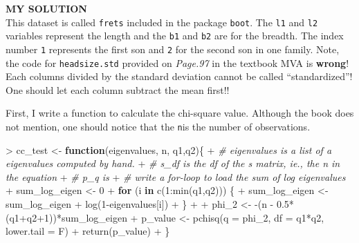 \documentclass[
]{article}
\newenvironment{Shaded}{\begin{snugshade}}{\end{snugshade}}
\newcommand{\AttributeTok}[1]{\textcolor[rgb]{0.77,0.63,0.00}{#1}}
\newcommand{\CommentTok}[1]{\textcolor[rgb]{0.56,0.35,0.01}{\textit{#1}}}
\newcommand{\ControlFlowTok}[1]{\textcolor[rgb]{0.13,0.29,0.53}{\textbf{#1}}}
\newcommand{\DecValTok}[1]{\textcolor[rgb]{0.00,0.00,0.81}{#1}}
\newcommand{\FloatTok}[1]{\textcolor[rgb]{0.00,0.00,0.81}{#1}}
\newcommand{\FunctionTok}[1]{\textcolor[rgb]{0.00,0.00,0.00}{#1}}
\newcommand{\NormalTok}[1]{#1}
\newcommand{\OtherTok}[1]{\textcolor[rgb]{0.56,0.35,0.01}{#1}}
\newcommand{\SpecialCharTok}[1]{\textcolor[rgb]{0.00,0.00,0.00}{#1}}
\begin{document}
\textbf{MY SOLUTION}\\
This dataset is called \texttt{frets} included in the package
\texttt{boot}. The \texttt{l1} and \texttt{l2} variables represent the
length and the \texttt{b1} and \texttt{b2} are for the breadth. The
index number \texttt{1} represents the first son and \texttt{2} for the
second son in one family. Note, the code for \texttt{headsize.std}
provided on \emph{Page.97} in the textbook MVA is \textbf{wrong}! Each
columns divided by the standard deviation cannot be called
``standardized''! One should let each column subtract the mean first!!

First, I write a function to calculate the chi-square value. Although
the book does not mention, one should notice that the \texttt{n}is the
number of observations.

\begin{Shaded}
\begin{Highlighting}[]
\SpecialCharTok{\textgreater{}}\NormalTok{ cc\_test }\OtherTok{\textless{}{-}} \ControlFlowTok{function}\NormalTok{(eigenvalues, n, q1,q2)\{}
\SpecialCharTok{+}   \CommentTok{\# eigenvalues is a list of a eigenvalues computed by hand.}
\SpecialCharTok{+}   \CommentTok{\# s\_df is the df of the s matrix, ie., the n in the equation}
\SpecialCharTok{+}   \CommentTok{\# p\_q is}
\SpecialCharTok{+}   \CommentTok{\# write a for{-}loop to load the sum of log eigenvalues}
\SpecialCharTok{+}\NormalTok{   sum\_log\_eigen }\OtherTok{\textless{}{-}} \DecValTok{0}
\SpecialCharTok{+}   \ControlFlowTok{for}\NormalTok{ (i }\ControlFlowTok{in} \FunctionTok{c}\NormalTok{(}\DecValTok{1}\SpecialCharTok{:}\FunctionTok{min}\NormalTok{(q1,q2))) \{}
\SpecialCharTok{+}\NormalTok{     sum\_log\_eigen }\OtherTok{\textless{}{-}}\NormalTok{ sum\_log\_eigen }\SpecialCharTok{+} \FunctionTok{log}\NormalTok{(}\DecValTok{1}\SpecialCharTok{{-}}\NormalTok{eigenvalues[i])}
\SpecialCharTok{+}\NormalTok{   \}}
\SpecialCharTok{+} 
\SpecialCharTok{+}\NormalTok{   phi\_2 }\OtherTok{\textless{}{-}} \SpecialCharTok{{-}}\NormalTok{(n }\SpecialCharTok{{-}} \FloatTok{0.5}\SpecialCharTok{*}\NormalTok{(q1}\SpecialCharTok{+}\NormalTok{q2}\SpecialCharTok{+}\DecValTok{1}\NormalTok{))}\SpecialCharTok{*}\NormalTok{sum\_log\_eigen}
\SpecialCharTok{+}\NormalTok{   p\_value }\OtherTok{\textless{}{-}} \FunctionTok{pchisq}\NormalTok{(}\AttributeTok{q =}\NormalTok{ phi\_2, }\AttributeTok{df =}\NormalTok{ q1}\SpecialCharTok{*}\NormalTok{q2, }\AttributeTok{lower.tail =}\NormalTok{ F)}
\SpecialCharTok{+}   \FunctionTok{return}\NormalTok{(p\_value)}
\SpecialCharTok{+}\NormalTok{ \}}
\end{Highlighting}
\end{Shaded}
\end{document}
